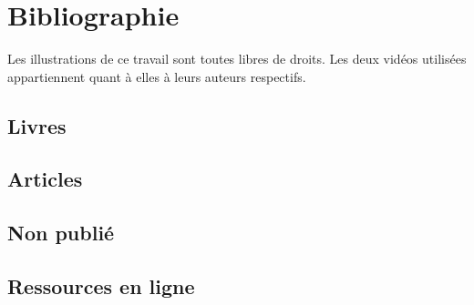 \documentclass[12pt,fleqn,oneside,french,openany]{book} %
\begin{document}


\chapter{Bibliographie}

\nocite{imgtitre,imgheader1,imgheader2,imgheader3,imgheader4,imgheader4,imgheader5,logo,analysedonnees} %

\begin{remark}
	Les illustrations de ce travail sont toutes libres de droits. Les deux vidéos utilisées appartiennent quant à elles à leurs auteurs respectifs.
\end{remark}

\section*{Livres}
\printbibliography[heading=bibempty,type=book]
\section*{Articles}
\printbibliography[heading=bibempty,type=article]
\section*{Non publié}
\printbibliography[heading=bibempty,type=unpublished]
\section*{Ressources en ligne}
\printbibliography[heading=bibempty,type=online]



\end{document}
